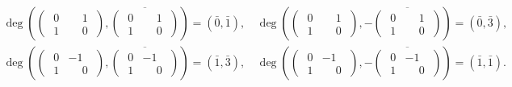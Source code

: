\begin{ex}
\begin{align*}
		\deg \left(\begin{pmatrix}
			\phantom{.}0 & \phantom{-}1\phantom{.} \\
			\phantom{.}1 & \phantom{-}0\phantom{.}
		\end{pmatrix}, \overline{\begin{pmatrix}
				\phantom{.}0 & \phantom{-}1\phantom{.} \\
				\phantom{.}1 & \phantom{-}0\phantom{.}
			\end{pmatrix}}\right) = (\bar 0, \bar 1),\, &
		\deg \left(\begin{pmatrix}
			\phantom{.}0 & \phantom{-}1\phantom{.} \\
			\phantom{.}1 & \phantom{-}0\phantom{.}
		\end{pmatrix}, -\overline{\begin{pmatrix}
				\phantom{.}0 & \phantom{-}1\phantom{.} \\
				\phantom{.}1 & \phantom{-}0\phantom{.}
			\end{pmatrix}}\right) = (\bar 0, \bar 3),    \\
		\deg \left(\begin{pmatrix}
			\phantom{.}0 & -1\phantom{.}           \\
			\phantom{.}1 & \phantom{-}0\phantom{.}
		\end{pmatrix}, \overline{\begin{pmatrix}
				\phantom{.}0 & -1\phantom{.}           \\
				\phantom{.}1 & \phantom{-}0\phantom{.}
			\end{pmatrix}}\right) = (\bar 1, \bar 3),\, &
		\deg \left(\begin{pmatrix}
			\phantom{.}0 & -1\phantom{.}           \\
			\phantom{.}1 & \phantom{-}0\phantom{.}
		\end{pmatrix}, -\overline{\begin{pmatrix}
				\phantom{.}0 & -1\phantom{.}           \\
				\phantom{.}1 & \phantom{-}0\phantom{.}
			\end{pmatrix}}\right) = (\bar 1, \bar 1).
	\end{align*}

\end{ex}
